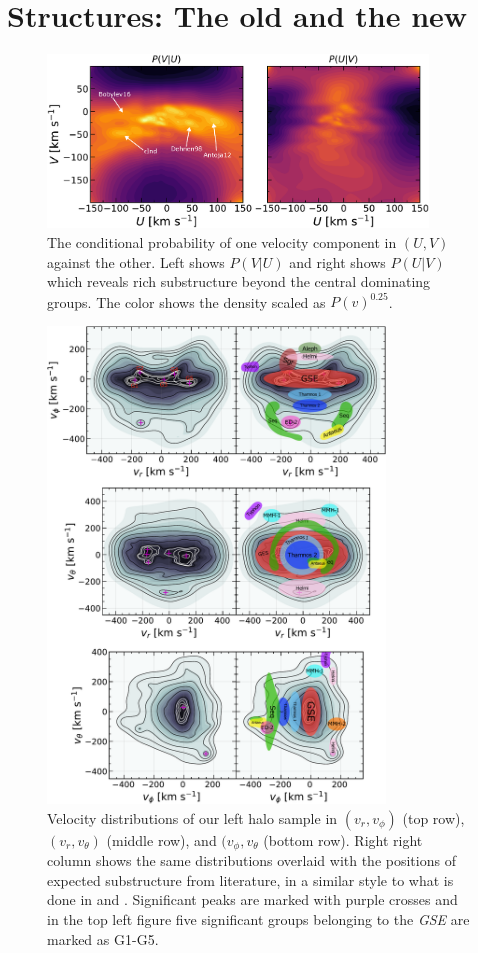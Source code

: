 \section{Structures: The old and the new}\label{sec:p3-structures}
\begin{figure}[t!]
    \centering
    \includegraphics[width=0.9\textwidth]{images/conditional_snbh.pdf}
    \caption{The conditional probability of one velocity component in $(U, V)$ against the other. Left shows $P(V|U)$ and right shows $P(U|V)$ which reveals rich substructure beyond the central dominating groups. The color shows the density scaled as $P(v)^{0.25}$.} %
    \label{fig:cond_snbh}
\end{figure}
\begin{figure}[t!]
    \centering
    \includegraphics[width=0.8\textwidth]{images/halo_fv.pdf}
    \caption{Velocity distributions of our left halo sample in $(v_r, v_\phi)$ (top row), $(v_r, v_\theta)$ (middle row), and $(v_\phi, v_\theta$ (bottom row). Right right column shows the same distributions overlaid with the positions of expected substructure from literature, in a similar style to what is done in \cite{naidu:20} and \cite{mardini:2022}. Significant peaks are marked with purple crosses and in the top left figure five significant groups belonging to the \textit{GSE} are marked as G1-G5.} %
    \label{fig:halo_fv}
\end{figure}

